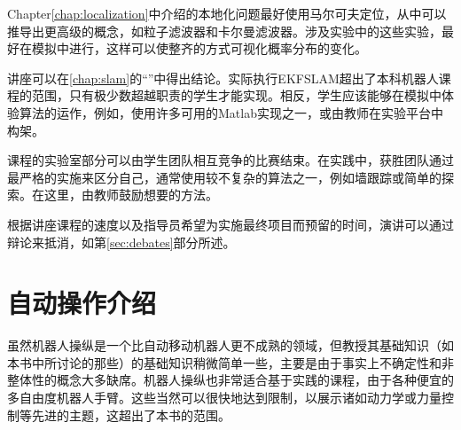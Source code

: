 
Chapter\ref{chap:localization}中介绍的本地化问题最好使用马尔可夫定位，从中可以推导出更高级的概念，如粒子滤波器和卡尔曼滤波器。涉及实验中的这些实验，最好在模拟中进行，这样可以使整齐的方式可视化概率分布的变化。

讲座可以在\ref{chap:slam}的“”中得出结论。实际执行EKFSLAM超出了本科机器人课程的范围，只有极少数超越职责的学生才能实现。相反，学生应该能够在模拟中体验算法的运作，例如，使用许多可用的Matlab实现之一，或由教师在实验平台中构架。

课程的实验室部分可以由学生团队相互竞争的比赛结束。在实践中，获胜团队通过最严格的实施来区分自己，通常使用较不复杂的算法之一，例如墙跟踪或简单的探索。在这里，由教师鼓励想要的方法。

根据讲座课程的速度以及指导员希望为实施最终项目而预留的时间，演讲可以通过辩论来抵消，如第\ref{sec:debates}部分所述。


\section {自动操作介绍}
虽然机器人操纵是一个比自动移动机器人更不成熟的领域，但教授其基础知识（如本书中所讨论的那些）的基础知识稍微简单一些，主要是由于事实上不确定性和非整体性的概念大多缺席。机器人操纵也非常适合基于实践的课程，由于各种便宜的多自由度机器人手臂。这些当然可以很快地达到限制，以展示诸如动力学或力量控制等先进的主题，这超出了本书的范围。



